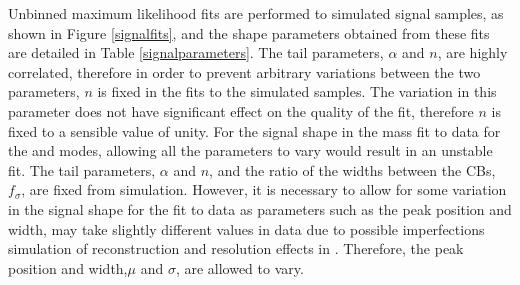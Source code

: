 Unbinned maximum likelihood fits are performed to simulated signal samples, as shown in Figure \ref{signalfits}, and the shape parameters obtained from these fits are detailed in Table \ref{signalparameters}. The tail parameters, $\alpha$ and $n$, are highly correlated, therefore in order to prevent arbitrary variations between the two parameters, $n$ is fixed in the fits to the simulated samples. The variation in this parameter does not have significant effect on the quality of the fit, therefore $n$ is fixed to a sensible value of unity. For the signal shape in the mass fit to data for the \kpi and \kpipipi modes, allowing all the parameters to vary would result in an unstable fit. The tail parameters, $\alpha$ and $n$, and the ratio of the widths between the CBs, $f_{\sigma}$, are fixed from simulation. However, it is necessary to allow for some variation in the signal shape for the fit to data as parameters such as the peak position and width, may take slightly different values in data due to possible imperfections simulation of reconstruction and resolution effects in \lhcb. Therefore, the peak position and width,$\mu$ and $\sigma$, are allowed to vary.

